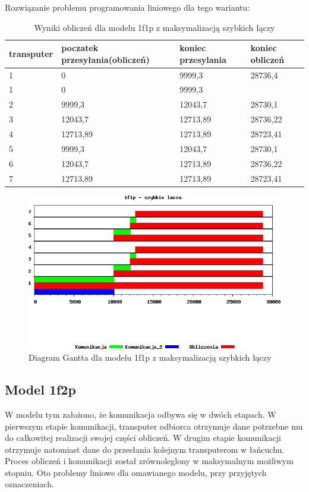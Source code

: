 \documentclass[a4paper,11pt, titlepage]{article}
\begin{document}
Rozwiązanie problemu programowania liniowego dla tego wariantu:
\begin{table}[hp!]
\begin{tabular}{|l|l|l|l|}\hline
transputer & poczatek przesyłania(obliczeń) & koniec przesylania & koniec obliczeń\\ \hline
1	&0			&9999,3		&28736,4\\ \hline
1	&0			&9999,3		&\\ \hline
2	&9999,3		&12043,7	&28730,1\\ \hline
3	&12043,7	&12713,89	&28736,22\\ \hline
4	&12713,89	&12713,89	&28723,41\\ \hline
5	&9999,3		&12043,7	&28730,1\\ \hline
6	&12043,7	&12713,89	&28736,22\\ \hline
7	&12713,89	&12713,89	&28723,41\\ \hline
\end{tabular}
\caption{Wyniki obliczeń dla modelu 1f1p z maksymalizacją szybkich łączy \label{1f1p_lt}}
\end{table}

\begin{figure}[htp!]
\includegraphics[width=1.0\textwidth]{wykresy/1p1f_lacza}
\caption{Diagram Gantta dla modelu 1f1p z maksymalizacją szybkich łączy \label{1p1f_l}}
\end{figure}
\subsection{Model 1f2p}
W modelu tym założono, że komunikacja odbywa się w dwóch etapach. W pierwszym etapie komunikacji, transputer odbiorca otrzymuje dane potrzebne mu do całkowitej realizacji swojej części obliczeń. W drugim etapie komunikacji otrzymuje natomiast dane do przesłania kolejnym transputerom w łańcuchu. Proces obliczeń i komunikacji został zrównoleglony w maksymalnym możliwym stopniu. Oto problemy liniowe dla omawianego modelu, przy przyjętych oznaczeniach.
\end{document}
